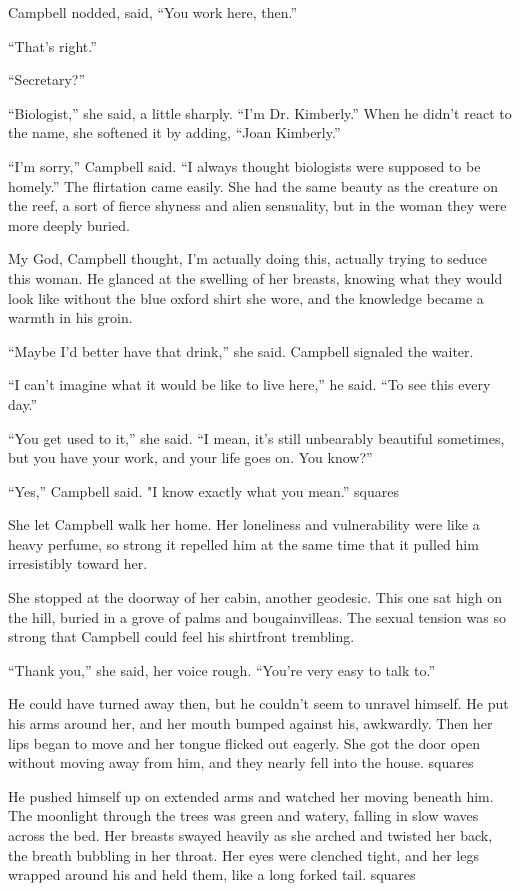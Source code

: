 Campbell nodded, said, ``You work here, then.''

``That's right.''

``Secretary?''

``Biologist,'' she said, a little sharply. ``I'm Dr. Kimberly.'' When he didn't react to the name, she softened it by adding, ``Joan Kimberly.''

``I'm sorry,'' Campbell said. ``I always thought biologists were supposed to be homely.'' The flirtation came easily. She had the same beauty as the creature on the reef, a sort of fierce shyness and alien sensuality, but in the woman they were more deeply buried.

My God, Campbell thought, I'm actually doing this, actually trying to seduce this woman. He glanced at the swelling of her breasts, knowing what they would look like without the blue oxford shirt she wore, and the knowledge became a warmth in his groin.

``Maybe I'd better have that drink,'' she said. Campbell signaled the waiter.

``I can't imagine what it would be like to live here,'' he said. ``To see this every day.''

``You get used to it,'' she said. ``I mean, it's still unbearably beautiful sometimes, but you have your work, and your life goes on. You know?''

``Yes,'' Campbell said. "I know exactly what you mean.''
squares

She let Campbell walk her home. Her loneliness and vulnerability were like a heavy perfume, so strong it repelled him at the same time that it pulled him irresistibly toward her.

She stopped at the doorway of her cabin, another geodesic. This one sat high on the hill, buried in a grove of palms and bougainvilleas. The sexual tension was so strong that Campbell could feel his shirtfront trembling.

``Thank you,'' she said, her voice rough. ``You're very easy to talk to.''

He could have turned away then, but he couldn't seem to unravel himself. He put his arms around her, and her mouth bumped against his, awkwardly. Then her lips began to move and her tongue flicked out eagerly. She got the door open without moving away from him, and they nearly fell into the house.
squares

He pushed himself up on extended arms and watched her moving beneath him. The moonlight through the trees was green and watery, falling in slow waves across the bed. Her breasts swayed heavily as she arched and twisted her back, the breath bubbling in her throat. Her eyes were clenched tight, and her legs wrapped around his and held them, like a long forked tail.
squares

